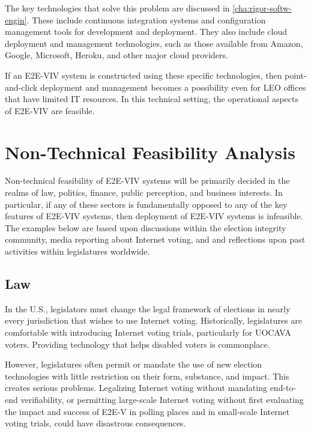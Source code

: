 The key technologies that solve this problem are discussed in
\autoref{cha:rigor-softw-engin}.  These include continuous integration
systems and configuration management tools for development and
deployment.  They also include cloud deployment and management
technologies, such as those available from Amazon, Google, Microsoft,
Heroku, and other major cloud providers.

If an E2E-VIV system is constructed using these specific technologies,
then point-and-click deployment and management becomes a possibility
even for LEO offices that have limited IT resources. In this technical
setting, the operational aspects of E2E-VIV are feasible.

\section{Non-Technical Feasibility Analysis}
\label{sec:non-technical-feasibility-analysis}

Non-technical feasibility of E2E-VIV systems will be primarily decided
in the realms of law, politics, finance, public perception, and
business interests. In particular, if any of these sectors is
fundamentally opposed to any of the key features of E2E-VIV systems,
then deployment of E2E-VIV systems is infeasible. The examples below
are based upon discussions within the election integrity community,
media reporting about Internet voting, and and reflections upon past
activities within legislatures worldwide.

\subsection{Law}

In the U.S., legislators must change the legal framework of elections
in nearly every jurisdiction that wishes to use Internet voting.
Historically, legislatures are comfortable with introducing Internet
voting trials, particularly for UOCAVA voters.  Providing technology
that helps disabled voters is commonplace.

However, legislatures often permit or mandate the use of new election
technologies with little restriction on their form, substance, and
impact.  This creates serious problems. Legalizing Internet voting
without mandating end-to-end verifiability, or permitting large-scale
Internet voting without first evaluating the impact and success of
E2E-V in polling places and in small-scale Internet voting trials,
could have disastrous consequences.

